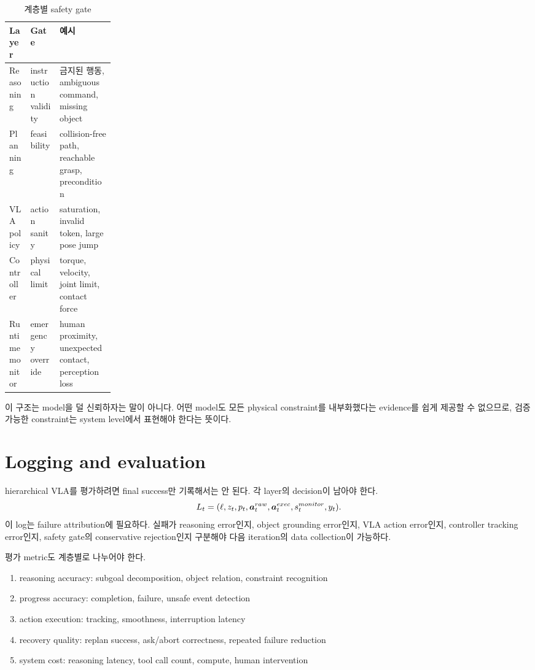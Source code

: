 \begin{table}[h]
  \centering
  \caption{계층별 safety gate}
  \begin{tabularx}{\linewidth}{p{0.2\linewidth}X X}
    \toprule
    Layer & Gate & 예시 \\
    \midrule
    Reasoning & instruction validity & 금지된 행동, ambiguous command, missing object \\
    Planning & feasibility & collision-free path, reachable grasp, precondition \\
    VLA policy & action sanity & saturation, invalid token, large pose jump \\
    Controller & physical limit & torque, velocity, joint limit, contact force \\
    Runtime monitor & emergency override & human proximity, unexpected contact, perception loss \\
    \bottomrule
  \end{tabularx}
  \label{tab:ch17-safety-gates}
\end{table}

이 구조는 model을 덜 신뢰하자는 말이 아니다. 어떤 model도 모든 physical constraint를 내부화했다는 evidence를 쉽게 제공할 수 없으므로, 검증 가능한 constraint는 system level에서 표현해야 한다는 뜻이다.

\section{Logging and evaluation}

hierarchical VLA를 평가하려면 final success만 기록해서는 안 된다. 각 layer의 decision이 남아야 한다.
\begin{equation}
  L_t
  =
  (
  \ell,
  z_t,
  p_t,
  \bm{a}_t^{raw},
  \bm{a}_t^{exec},
  s_t^{monitor},
  y_t
  ).
  \label{eq:ch17-log-record}
\end{equation}
이 log는 failure attribution에 필요하다. 실패가 reasoning error인지, object grounding error인지, VLA action error인지, controller tracking error인지, safety gate의 conservative rejection인지 구분해야 다음 iteration의 data collection이 가능하다.

평가 metric도 계층별로 나누어야 한다.
\begin{enumerate}
  \item reasoning accuracy: subgoal decomposition, object relation, constraint recognition
  \item progress accuracy: completion, failure, unsafe event detection
  \item action execution: tracking, smoothness, interruption latency
  \item recovery quality: replan success, ask/abort correctness, repeated failure reduction
  \item system cost: reasoning latency, tool call count, compute, human intervention
\end{enumerate}

